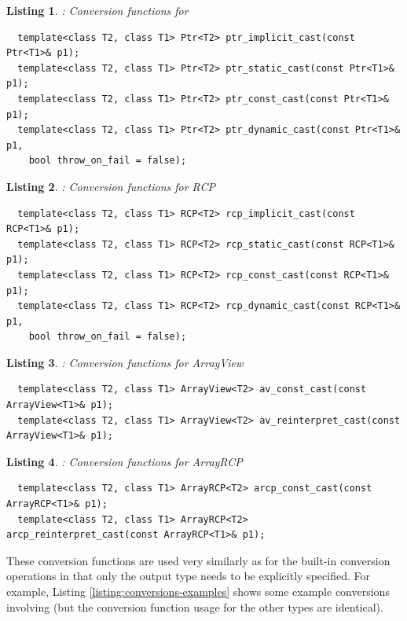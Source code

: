\documentclass[pdf,ps2pdf,11pt]{SANDreport}
\newtheorem{listing}{Listing}
\begin{document}
{}\begin{listing}: Conversion functions for {}
\label{listing:Ptr-conversions}
{\small\begin{verbatim}
  template<class T2, class T1> Ptr<T2> ptr_implicit_cast(const Ptr<T1>& p1);
  template<class T2, class T1> Ptr<T2> ptr_static_cast(const Ptr<T1>& p1);
  template<class T2, class T1> Ptr<T2> ptr_const_cast(const Ptr<T1>& p1);
  template<class T2, class T1> Ptr<T2> ptr_dynamic_cast(const Ptr<T1>& p1,
    bool throw_on_fail = false);
\end{verbatim}}
\end{listing}


\begin{listing}: Conversion functions for RCP\\
\label{listing:RCP-conversions}
{\small\begin{verbatim}
  template<class T2, class T1> RCP<T2> rcp_implicit_cast(const RCP<T1>& p1);
  template<class T2, class T1> RCP<T2> rcp_static_cast(const RCP<T1>& p1);
  template<class T2, class T1> RCP<T2> rcp_const_cast(const RCP<T1>& p1);
  template<class T2, class T1> RCP<T2> rcp_dynamic_cast(const RCP<T1>& p1,
    bool throw_on_fail = false);
\end{verbatim}}
\end{listing}


\begin{listing}: Conversion functions for ArrayView\\
\label{listing:ArrayView-conversions}
{\small\begin{verbatim}
  template<class T2, class T1> ArrayView<T2> av_const_cast(const ArrayView<T1>& p1);
  template<class T2, class T1> ArrayView<T2> av_reinterpret_cast(const ArrayView<T1>& p1);
\end{verbatim}}
\end{listing}


\begin{listing}: Conversion functions for ArrayRCP\\
\label{listing:ArrayRCP-conversions}
{\small\begin{verbatim}
  template<class T2, class T1> ArrayRCP<T2> arcp_const_cast(const ArrayRCP<T1>& p1);
  template<class T2, class T1> ArrayRCP<T2> arcp_reinterpret_cast(const ArrayRCP<T1>& p1);
\end{verbatim}}
\end{listing}


These conversion functions are used very similarly as for the built-in
conversion operations in that only the output type needs to be
explicitly specified.  For example, Listing
{}\ref{listing:conversions-examples} shows some example conversions
involving {} (but the conversion function usage for the other
types are identical).
\end{document}
